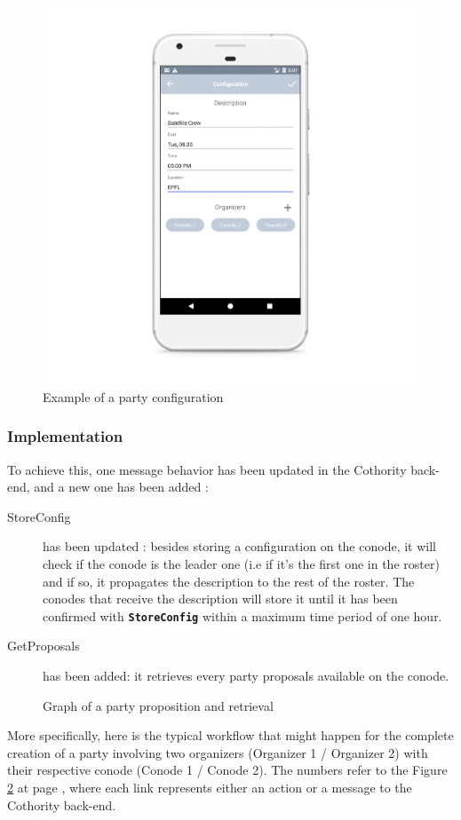 \begin{figure}[t]
	\centering
	\includegraphics[height=0.8\linewidth]{resources/pop_config_ui.png}
	\caption{Example of a party configuration}
	\label{fig:pop_config_ui}
\end{figure}

\subsubsection{Implementation}
To achieve this, one message behavior has been updated in the Cothority back-end, and a new one has been added :
\begin{description}
	\item[StoreConfig] has been updated : besides storing a configuration on the conode, it will check if the conode is the leader one (i.e if it's the first one in the roster) and if so, it propagates the description to the rest of the roster. The conodes that receive the description will store it until it has been confirmed with \texttt{\textbf{StoreConfig}} within a maximum time period of one hour.
	\item[GetProposals] has been added: it retrieves every party proposals available on the conode.
\end{description}
\begin{figure}
	\centering
	
	\caption{Graph of a party proposition and retrieval}
	\label{fig:proposal_graph}
\end{figure}
More specifically, here is the typical workflow that might happen for the complete creation of a party involving two organizers (Organizer 1 / Organizer 2) with their respective conode (Conode 1 / Conode 2). The numbers refer to the Figure \ref{fig:proposal_graph} at page \pageref{fig:proposal_graph}, where each link represents either an action or a message to the Cothority back-end.

